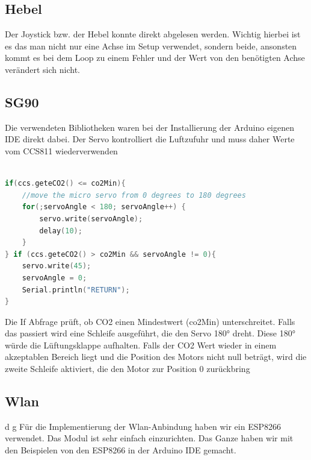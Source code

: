 \subsection{Hebel}

Der Joystick bzw.  der Hebel konnte direkt abgelesen werden. Wichtig hierbei ist es das man nicht nur eine Achse im Setup verwendet, sondern beide, ansonsten kommt es bei dem Loop zu einem Fehler und der Wert von den benötigten Achse verändert sich nicht.


\subsection{SG90}

Die verwendeten Bibliotheken waren bei der Installierung der Arduino eigenen IDE direkt dabei. Der Servo kontrolliert die Luftzufuhr und muss daher Werte vom CCS811 wiederverwenden

\begin{lstlisting}[language=C, caption=Automatisierten Servobewegung bei zu niedrigen CO2 Werten, label=code:SG90]

if(ccs.geteCO2() <= co2Min){
	//move the micro servo from 0 degrees to 180 degrees
	for(;servoAngle < 180; servoAngle++) {       
		servo.write(servoAngle);              
		delay(10);
	} 
} if (ccs.geteCO2() > co2Min && servoAngle != 0){
	servo.write(45); 
	servoAngle = 0;
	Serial.println("RETURN");
}
\end{lstlisting}
\cite{SG90tut}

Die If Abfrage prüft, ob CO2 einen Mindestwert (co2Min) unterschreitet. Falls das passiert wird eine Schleife ausgeführt, die den Servo 180° dreht. Diese 180° würde die Lüftungsklappe aufhalten. Falls der CO2 Wert wieder in einem akzeptablen Bereich liegt und die Position des Motors nicht null beträgt, wird die zweite Schleife aktiviert, die den Motor zur Position 0 zurückbring

\newpage
\def \currentAuthor {Florian Tipotsch}
\newpage
\subsection{Wlan}                                                                                                      d  g  Für die Implementierung der Wlan-Anbindung haben wir ein ESP8266 verwendet. Das Modul ist sehr einfach einzurichten. Das Ganze haben wir mit den Beispielen von den ESP8266 in der Arduino IDE gemacht.


